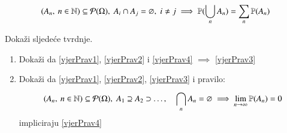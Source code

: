 \begin{equation} \label{vjerPrav4}
    (A_n, \: n \in \mathbb{N}) \subseteq \mathcal{P}({\Omega}), \; A_i
        \cap A_j = \varnothing, \; i \neq j \implies
        \mathbb{P}({\bigcup\limits_{n}^{} A_n}) = \sum\limits_{n}^{} \mathbb{P}({A_n})
\end{equation}

\begin{zad} \label{zadatak12}
    Doka\v zi sljede\' ce tvrdnje.
    \begin{enumerate}[label=(\alph*)]
        \item Doka\v zi da \eqref{vjerPrav1}, \eqref{vjerPrav2}
            i \eqref{vjerPrav4} $\implies$ \eqref{vjerPrav3}
        \item Doka\v zi da \eqref{vjerPrav1}, \eqref{vjerPrav2},
            \eqref{vjerPrav3} i pravilo:
            \begin{align} \label{neprPrazSkup}
                (A_n, \: n \in \mathbb{N}) \subseteq \mathcal{P}({\Omega}),
                    \; A_1 \supseteq A_2 \supset \dots, \quad
                    \bigcap\limits_{n}^{} A_n
                    = \varnothing \implies \lim_{n \to \infty}
                    \mathbb{P}({A_n}) = 0
             \end{align}
             impliciraju \eqref{vjerPrav4}
    \end{enumerate}
\end{zad}


